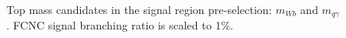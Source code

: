 \begin{figure}[h!]
\caption{Top mass candidates in the signal region pre-selection: $m_{W b}$ and $m_{q\gamma}$. FCNC signal branching ratio is scaled to 1\%.}
\label{fig:PreSelTopMasses}
\end{figure}





